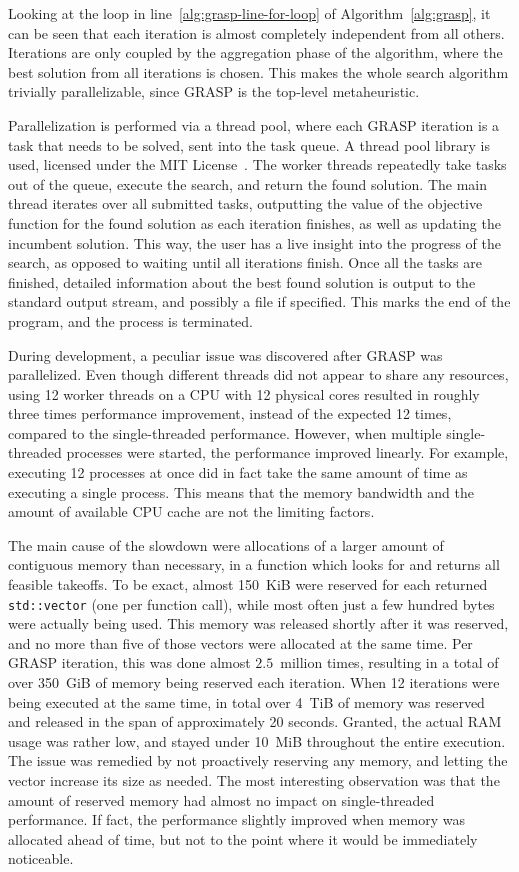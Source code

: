 Looking at the loop in line~\ref{alg:grasp-line-for-loop} of Algorithm~\ref{alg:grasp}, it can be seen that each iteration is almost completely independent from all others.
Iterations are only coupled by the aggregation phase of the algorithm, where the best solution from all iterations is chosen.
This makes the whole search algorithm trivially parallelizable, since GRASP is the top-level metaheuristic.

Parallelization is performed via a thread pool, where each GRASP iteration is a task that needs to be solved, sent into the task queue.
A thread pool library is used, licensed under the MIT License~\cite{Shoshany/ThreadPool}.
The worker threads repeatedly take tasks out of the queue, execute the search, and return the found solution.
The main thread iterates over all submitted tasks, outputting the value of the objective function for the found solution as each iteration finishes, as well as updating the incumbent solution.
This way, the user has a live insight into the progress of the search, as opposed to waiting until all iterations finish.
Once all the tasks are finished, detailed information about the best found solution is output to the standard output stream, and possibly a file if specified.
This marks the end of the program, and the process is terminated.

During development, a peculiar issue was discovered after GRASP was parallelized.
Even though different threads did not appear to share any resources, using 12 worker threads on a CPU with 12 physical cores resulted in roughly three times performance improvement, instead of the expected 12 times, compared to the single-threaded performance.
However, when multiple single-threaded processes were started, the performance improved linearly.
For example, executing 12 processes at once did in fact take the same amount of time as executing a single process.
This means that the memory bandwidth and the amount of available CPU cache are not the limiting factors.

The main cause of the slowdown were allocations of a larger amount of contiguous memory than necessary, in a function which looks for and returns all feasible takeoffs.
To be exact, almost 150~KiB were reserved for each returned \texttt{std::vector} (one per function call), while most often just a few hundred bytes were actually being used.
This memory was released shortly after it was reserved, and no more than five of those vectors were allocated at the same time.
Per GRASP iteration, this was done almost $2.5$~million times, resulting in a total of over 350~GiB of memory being reserved each iteration.
When 12 iterations were being executed at the same time, in total over 4~TiB of memory was reserved and released in the span of approximately 20 seconds.
Granted, the actual RAM usage was rather low, and stayed under 10~MiB throughout the entire execution.
The issue was remedied by not proactively reserving any memory, and letting the vector increase its size as needed.
The most interesting observation was that the amount of reserved memory had almost no impact on single-threaded performance.
If fact, the performance slightly improved when memory was allocated ahead of time, but not to the point where it would be immediately noticeable.

